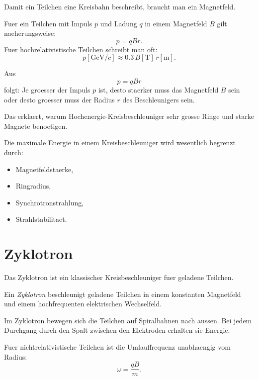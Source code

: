 Damit ein Teilchen eine Kreisbahn beschreibt, braucht man ein Magnetfeld.

\begin{formulabox}
Fuer ein Teilchen mit Impuls $p$ und Ladung $q$ in einem Magnetfeld $B$ gilt
naeherungsweise:
\[
    p = qBr.
\]
Fuer hochrelativistische Teilchen schreibt man oft:
\[
    p[\mathrm{GeV}/c]
    \approx
    0.3\,B[\mathrm{T}]\,r[\mathrm{m}].
\]
\end{formulabox}

\begin{conceptbox}
Aus
\[
    p=qBr
\]
folgt:
Je groesser der Impuls $p$ ist, desto staerker muss das Magnetfeld $B$ sein
oder desto groesser muss der Radius $r$ des Beschleunigers sein.

Das erklaert, warum Hochenergie-Kreisbeschleuniger sehr grosse Ringe und starke
Magnete benoetigen.
\end{conceptbox}

\begin{examtipbox}
Die maximale Energie in einem Kreisbeschleuniger wird wesentlich begrenzt durch:
\begin{itemize}
    \item Magnetfeldstaerke,
    \item Ringradius,
    \item Synchrotronstrahlung,
    \item Strahlstabilitaet.
\end{itemize}
\end{examtipbox}

\section{Zyklotron}

Das Zyklotron ist ein klassischer Kreisbeschleuniger fuer geladene Teilchen.

\begin{definitionbox}
Ein \emph{Zyklotron} beschleunigt geladene Teilchen in einem konstanten Magnetfeld
und einem hochfrequenten elektrischen Wechselfeld.
\end{definitionbox}

\begin{conceptbox}
Im Zyklotron bewegen sich die Teilchen auf Spiralbahnen nach aussen.
Bei jedem Durchgang durch den Spalt zwischen den Elektroden erhalten sie Energie.

Fuer nichtrelativistische Teilchen ist die Umlauffrequenz unabhaengig vom Radius:
\[
    \omega = \frac{qB}{m}.
\]
\end{conceptbox}

